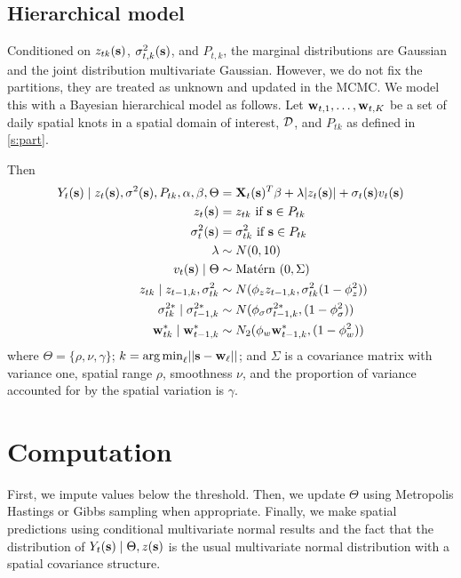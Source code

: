 \documentclass[11pt]{article}
\begin{document}
\subsection{Hierarchical model}\label{s:hier}
Conditioned on $z_{tk}(\mbox{\bf s})$, $\sigma^2_{t,k}(\mbox{\bf s})$, and $P_{t,k}$, the marginal distributions are Gaussian and the joint distribution multivariate Gaussian.
However, we do not fix the partitions, they are treated as unknown and updated in the MCMC.
We model this with a Bayesian hierarchical model as follows.
Let $\mbox{\bf w}_{t,1}, \ldots, \mbox{\bf w}_{t,K}$ be a set of daily spatial knots in a spatial domain of interest, ${\cal D}$, and $P_{tk}$ as defined in \ref{s:part}.

Then
\begin{align}
   Y_t(\mbox{\bf s}) \mid z_{t}(\mbox{\bf s}), \sigma^2(\mbox{\bf s}), P_{tk}, \alpha, \beta, \Theta &= \mbox{\bf X}_t(\mbox{\bf s})^T \beta + \lambda |z_t(\mbox{\bf s})| + \sigma_t(\mbox{\bf s}) v_t(\mbox{\bf s}) \label{eq:hier}\\
   z_t(\mbox{\bf s}) &= z_{tk} \text{ if } \mbox{\bf s} \in P_{tk}\\
   \sigma^2_{t}(\mbox{\bf s}) &= \sigma^2_{tk} \text{ if } \mbox{\bf s} \in P_{tk}\\
   \lambda &\sim N(0, 10)\\
   v_t(\mbox{\bf s}) \mid \Theta &\sim \mbox{Mat$\acute{\mbox{e}}$rn }(0, \Sigma)\\
   z_{tk} \mid z_{t-1, k}, \sigma^2_{tk} &\sim N(\phi_z z_{t-1, k}, \sigma^2_{tk} (1 - \phi_z^2))\\
   \sigma^{2*}_{tk} \mid \sigma^{2*}_{t-1, k} &\sim N(\phi_\sigma \sigma^{2*}_{t-1, k}, (1 - \phi_\sigma^2))\\
   \mbox{\bf w}^*_{tk} \mid \mbox{\bf w}^*_{t-1, k} &\sim N_2(\phi_w \mbox{\bf w}^*_{t-1, k}, (1 - \phi_w^2))
\end{align}
where $\Theta = \{\rho, \nu, \gamma\}$; \mbox{$k = {\mathop{\rm arg\, min}}_\ell ||\mbox{\bf s} - \mbox{\bf w}_\ell ||$}; and $\Sigma$ is a \Matern covariance matrix with variance one, spatial range $\rho$, smoothness $\nu$, and the proportion of variance accounted for by the spatial variation is $\gamma$.

\section{Computation}\label{s:comp}
First, we impute values below the threshold.
Then, we update $\Theta$ using Metropolis Hastings or Gibbs sampling when appropriate.
Finally, we make spatial predictions using conditional multivariate normal results and the fact that the distribution of $Y_t(\mbox{\bf s}) \mid \Theta, z(\mbox{\bf s})$ is the usual multivariate normal distribution with a \Matern spatial covariance structure.
\end{document}
